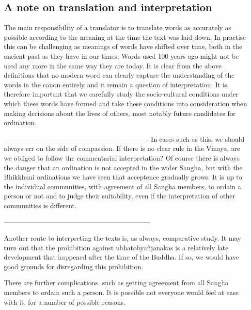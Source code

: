 \subsection{A note on translation and interpretation}
The main responsibility of a translator is to translate words as accurately as possible according to the meaning at the time the text was laid down. In practise this can be challenging as meanings of words have shifted over time, both in the ancient past as they have in our times. Words used 100 years ago might not be used any more in the same way they are today. It is clear from the above definitions that no modern word can clearly capture the understanding of the words in the canon entirely and it remain a question of interpretation. It is therefore important that we carefully study the socio-cultural conditions under which these words have formed and take these conditions into consideration when making decisions about the lives of others, most notably future candidates for ordination.


----------------------------------------------------------------
In cases such as this, we should always err on the side of compassion. If there is no clear rule in the Vinaya, are we obliged to follow the commentarial interpretation? Of course there is always the danger that an ordination is not accepted in the wider Sangha, but with the Bhikkhuni ordinations we have seen that acceptence gradually grows. It is up to the individual communities, with agreement of all Sangha members, to ordain a person or not and to judge their suitability, even if the interpretation of other communities is different. 



-----------------------------------------------------------------



Another route to interpreting the texts is, as always, comparative study. It may turn out that the prohibition against ubhatobyañjanakas is a relatively late development that happened after the time of the Buddha. If so, we would have good grounds for disregarding this prohibition.

There are further complications, such as getting agreement from all Sangha members to ordain such a person. It is possible not everyone would feel at ease with it, for a number of possible reasons.

